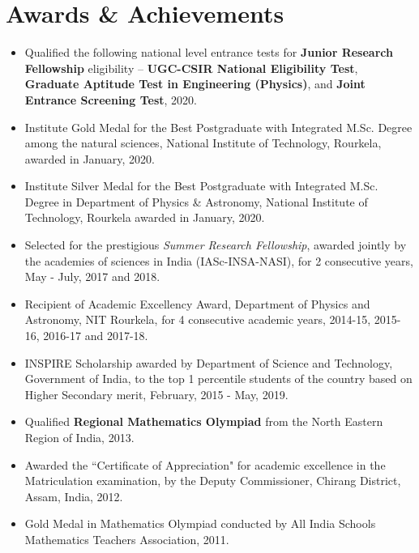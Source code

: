 \documentclass[11pt, letterpaper]{article}
\begin{document}
	\section{Awards \& Achievements}
	\begin{itemize}
	\renewcommand{\labelitemi}{\color{blue}$\scriptstyle{\lozenge}$}
		\item Qualified the following national level entrance tests for \textbf{Junior Research Fellowship} eligibility -- \textbf{UGC-CSIR National Eligibility Test}, \textbf{Graduate Aptitude Test in Engineering (Physics)}, and \textbf{Joint Entrance Screening Test}, 2020.
				
		\item Institute Gold Medal for the Best Postgraduate with Integrated M.Sc. Degree among the natural sciences, National Institute of Technology, Rourkela, awarded in January, 2020.

		\item Institute Silver Medal for the Best Postgraduate with Integrated M.Sc. Degree in Department of Physics \& Astronomy, National Institute of Technology, Rourkela awarded in January, 2020.

		\item Selected for the prestigious \emph{Summer Research Fellowship}, awarded jointly by the academies of sciences in India (IASc-INSA-NASI), for 2 consecutive years, May - July, 2017 and 2018.

		\item Recipient of Academic Excellency Award, Department of Physics and Astronomy, NIT Rourkela, for 4 consecutive academic years, 2014-15, 2015-16, 2016-17 and 2017-18.

		\item INSPIRE Scholarship awarded by Department of Science and Technology, Government of India, to the top 1 percentile students of the country based on Higher Secondary merit, February, 2015 - May, 2019.

		\item Qualified \textbf{Regional Mathematics Olympiad} from the North Eastern Region of India, 2013.

		\item Awarded the ``Certificate of Appreciation" for academic excellence in the Matriculation examination, by the Deputy Commissioner, Chirang District, Assam, India, 2012.

		\item Gold Medal in Mathematics Olympiad conducted by All India Schools Mathematics Teachers Association, 2011.
	\end{itemize}
\end{document}
